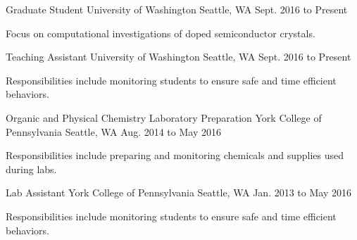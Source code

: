 

\begin{cventries}


  \cventry
    {Graduate Student} %
    {University of Washington} %
    {Seattle, WA} %
    {Sept. 2016 to Present} %
    {
      \begin{cvitems} %
        \item {Focus on computational investigations of doped semiconductor crystals.}
      \end{cvitems}
    }

  \cventry
    {Teaching Assistant} %
    {University of Washington} %
    {Seattle, WA} %
    {Sept. 2016 to Present} %
    {
      \begin{cvitems} %
        \item {Responsibilities include monitoring students to ensure safe and time efficient behaviors.}
      \end{cvitems}
    }

  \cventry
    {Organic and Physical Chemistry Laboratory Preparation} %
    {York College of Pennsylvania} %
    {Seattle, WA} %
    {Aug. 2014 to May 2016} %
    {
      \begin{cvitems} %
        \item {Responsibilities include preparing and monitoring chemicals and supplies used during labs.}
      \end{cvitems}
    }

  \cventry
    {Lab Assistant} %
    {York College of Pennsylvania} %
    {Seattle, WA} %
    {Jan. 2013 to May 2016} %
    {
      \begin{cvitems} %
        \item {Responsibilities include monitoring students to ensure safe and time efficient behaviors.}
      \end{cvitems}
    }


\end{cventries}

